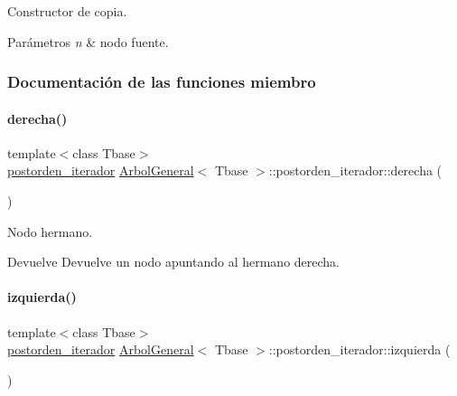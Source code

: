 Constructor de copia. 


\begin{DoxyParams}{Parámetros}
{\em n} & nodo fuente. \\
\hline
\end{DoxyParams}


\subsubsection{Documentación de las funciones miembro}
\hypertarget{classArbolGeneral_1_1postorden__iterador_ae2b24cd3445cac918c67574c0879b189}{}\label{classArbolGeneral_1_1postorden__iterador_ae2b24cd3445cac918c67574c0879b189} 
\paragraph{\texorpdfstring{derecha()}{derecha()}}
{\footnotesize\ttfamily template$<$class Tbase$>$ \\
\hyperlink{classArbolGeneral_1_1postorden__iterador}{postorden\+\_\+iterador} \hyperlink{classArbolGeneral}{Arbol\+General}$<$ Tbase $>$\+::postorden\+\_\+iterador\+::derecha (\begin{DoxyParamCaption}{ }\end{DoxyParamCaption})\hspace{0.3cm}{\ttfamily [inline]}}



Nodo hermano. 

\begin{DoxyReturn}{Devuelve}
Devuelve un nodo apuntando al hermano derecha. 
\end{DoxyReturn}
\hypertarget{classArbolGeneral_1_1postorden__iterador_a41de2f17fa6fd5f76654770858d4f3b2}{}\label{classArbolGeneral_1_1postorden__iterador_a41de2f17fa6fd5f76654770858d4f3b2} 
\paragraph{\texorpdfstring{izquierda()}{izquierda()}}
{\footnotesize\ttfamily template$<$class Tbase$>$ \\
\hyperlink{classArbolGeneral_1_1postorden__iterador}{postorden\+\_\+iterador} \hyperlink{classArbolGeneral}{Arbol\+General}$<$ Tbase $>$\+::postorden\+\_\+iterador\+::izquierda (\begin{DoxyParamCaption}{ }\end{DoxyParamCaption})\hspace{0.3cm}{\ttfamily [inline]}}



